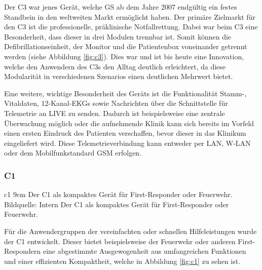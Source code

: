 Der \gls{C3} war jenes Gerät, welche \gls{GS} ab dem Jahre 2007 endgültig ein festes Standbein in den weltweiten Markt ermöglicht haben.
Der primäre Zielmarkt für den \gls{C3} ist die professionelle, präklinische Notfallrettung.
Dabei war beim \gls{C3} eine Besonderheit, dass dieser in drei Modulen trennbar ist.
Somit können die Defibrillationseinheit, der Monitor und die Patientenbox voneinander getrennt werden (siehe Abbildung \ref{fig:c3}).
Dies war und ist bis heute eine Innovation, welche den Anwendern des \gls{C3}s den Alltag deutlich erleichtert, da diese Modularität in verschiedenen Szenarios einen deutlichen Mehrwert bietet.

Eine weitere, wichtige Besonderheit des Geräts ist die Funktionalität Stamm-, Vitaldaten, 12-Kanal-\gls{EKG}s sowie Nachrichten über die Schnittstelle für Telemetrie an \gls{LIVE} zu senden.
Dadurch ist beispielsweise eine zentrale Überwachung möglich oder die aufnehmende Klinik kann sich bereits im Vorfeld einen ersten Eindruck des Patienten verschaffen, bevor dieser in das Klinikum eingeliefert wird.
Diese Telemetrieverbindung kann entweder per LAN, W-LAN oder dem Mobilfunkstandard GSM erfolgen.





\subsubsection{\acrlong*{C1}}
\bild
{c1}
{9cm}
{Der \acrlong{C1} als kompaktes Gerät für First-Responder oder Feuerwehr. Bildquelle: Intern}
{Der \acrlong*{C1} als kompaktes Gerät für First-Responder oder Feuerwehr.}

Für die Anwendergruppen der vereinfachten oder schnellen Hilfeleistungen wurde der \gls{C1} entwickelt.
Dieser bietet beispielsweise der Feuerwehr oder anderen First-Respondern eine abgestimmte Ausgewogenheit aus umfangreichen Funktionen und einer effizienten Kompaktheit, welche in Abbildung \ref{fig:c1} zu sehen ist.



